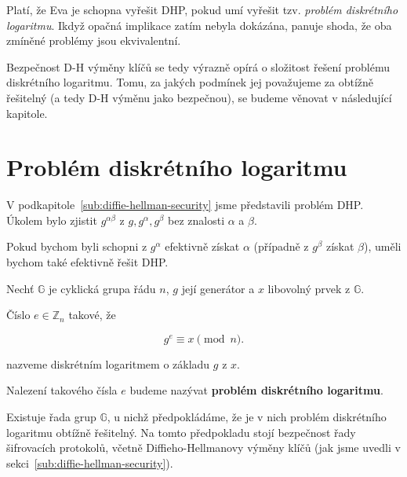 \documentclass[
  program=infoi,
  biblatex,
  figures=false,
  glossaries,
  index
]{kidiplom}
\begin{document}

        Platí, že Eva je schopna vyřešit DHP, pokud umí vyřešit tzv. \emph{problém diskrétního logaritmu}.
        Ikdyž opačná implikace zatím nebyla dokázána, panuje shoda, že oba zmíněné problémy jsou ekvivalentní.

        Bezpečnost D-H výměny klíčů se tedy výrazně opírá o složitost řešení problému diskrétního logaritmu.
        Tomu, za jakých podmínek jej považujeme za obtížně řešitelný (a tedy D-H výměnu jako bezpečnou), se budeme věnovat v následující kapitole.
    

\section{Problém diskrétního logaritmu}\label{sec:discrete-log}
    

        V podkapitole~\ref{sub:diffie-hellman-security} jsme představili problém DHP.
        Úkolem bylo zjistit $g^{\alpha \beta}$ z $g, g^\alpha, g^\beta$ bez znalosti $\alpha$ a $\beta$.

        Pokud bychom byli schopni z $g^\alpha$ efektivně získat $\alpha$ (případně z $g^\beta$ získat $\beta$), uměli bychom také
        efektivně řešit DHP.

        \begin{definition}\label{def:dlp}
            
            Nechť $\mathbb{G}$ je cyklická grupa řádu $n$, $g$ její generátor a $x$ libovolný prvek z $\mathbb{G}$.

            Číslo $e \in \mathbb{Z}_n$ takové, že

                \begin{equation}\label{eq:discrete-log}
                    g^e \equiv x \pmod{n}.
                \end{equation}
            
            nazveme diskrétním logaritmem o základu $g$ z $x$.

            Nalezení takového čísla $e$ budeme nazývat \textbf{problém diskrétního logaritmu}.

        \end{definition}
        
        Existuje řada grup $\mathbb{G}$, u nichž předpokládáme, že je v nich problém diskrétního logaritmu obtížně řešitelný.
        Na tomto předpokladu stojí bezpečnost řady šifrovacích protokolů, včetně Diffieho-Hellmanovy výměny klíčů
        (jak jsme uvedli v sekci~\ref{sub:diffie-hellman-security}).
\end{document}
